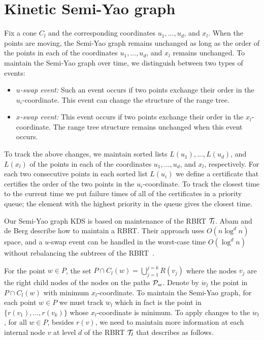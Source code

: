 \documentclass[11pt]{llncs}
\begin{document}
\section{Kinetic Semi-Yao graph}\label{sec:KineticSY}
Fix a cone $C_l$ and the corresponding coordinates $u_1,...,u_d$, and $x_l$. When the points are moving, the Semi-Yao graph remains unchanged as long as the order of the points in each of the coordinates $u_1,...,u_d$, and $x_l$ remains unchanged. To maintain the Semi-Yao graph over time, we distinguish between two types of events:
\begin{itemize}
\item \textit{$u$-swap event:} Such an event occurs if two points exchange their order in the $u_i$-coordinate. This event can change the structure of the range tree.
\item \textit{$x$-swap event:} This event occurs if two points exchange their order in the $x_l$-coordinate. The range tree structure remains unchanged when this event occurs.
\end{itemize}
To track the above changes, we maintain sorted lists $L(u_1),...,L(u_d)$, and $L(x_l)$ of the points in each of the coordinates $u_1,...,u_d$, and $x_l$, respectively. For each two consecutive points in each sorted list $L(u_i)$ we define a certificate that certifies the order of the two points in the $u_i$-coordinate. To track the closest time to the current time we put failure times of all of the certificates in a priority queue; the element with the highest priority in the queue gives the closest time.

Our Semi-Yao graph KDS is based on maintenance of the RBRT ${\cal T}_l$. Abam and de Berg describe how to maintain a RBRT. Their approach uses $O(n\log^d n)$ space, and a $u$-swap event can be handled in the worst-case time $O(\log^d n)$ without rebalancing the subtrees of the RBRT~\cite{Abam:2011:KSX:1971362.1971367}.

For the point $w\in P$, the set $P\cap C_l(w)=\bigcup_{j=1}^{j=k} R(v_j)$ where the nodes $v_j$ are the right child nodes of the nodes on the paths ${\cal P}_w$. Denote by $\ddot{w}_l$ the point in $P\cap C_l(w)$ with minimum $x_l$-coordinate. To maintain the Semi-Yao graph, for each point $w\in P$ we must track $\ddot{w}_l$ which in fact is the point in $\{r(v_1),...,r(v_k)\}$ whose $x_l$-coordinate is minimum. To apply changes to the $\ddot{w}_l$, for all $w\in P$, besides $r(v)$, we need to maintain more information at each internal node $v$ at level $d$ of the RBRT ${\cal T}_l$ that describes as follows.
\end{document}
